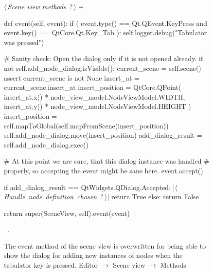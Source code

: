 \documentclass[%
    a4paper,    %
    justified,  %
    nobib,      %
    openany     %
]{tufte-book}
\begin{document}
\begin{figure}
\begin{flushleft} \small
\begin{minipage}{\linewidth}\label{scrap151}\raggedright\small
{} $\langle\,${\itshape Scene view methods}\nobreak\ {\footnotesize {?}}$\,\rangle\equiv$
\vspace{-1ex}
\begin{pythoncode}
def event(self, event):
    if (
            event.type() == Qt.QEvent.KeyPress and
            event.key()  == QtCore.Qt.Key_Tab
    ):
        self.logger.debug("Tabulator was pressed")

        # Sanity check: Open the dialog only if it is not opened already.
        if not self.add_node_dialog.isVisible():
            current_scene = self.scene()
            assert current_scene is not None
            insert_at = current_scene.insert_at
            insert_position = QtCore.QPoint(
                insert_at.x() * node_view_model.NodeViewModel.WIDTH,
                insert_at.y() * node_view_model.NodeViewModel.HEIGHT
            )
            insert_position = self.mapToGlobal(self.mapFromScene(insert_position))
            self.add_node_dialog.move(insert_position)
            add_dialog_result = self.add_node_dialog.exec()

            # At this point we are sure, that this dialog instance was handled
            # properly, so accepting the event might be sane here.
            event.accept()

            if add_dialog_result == QtWidgets.QDialog.Accepted:
                |\hbox{$\langle\,${\itshape Handle node definition chosen}\nobreak\ {\footnotesize ?}$\,\rangle$}|
                return True
            else:
                return False

    return super(SceneView, self).event(event)
|\NWsep|
\end{pythoncode}
\vspace{1.5ex}
\footnotesize
\begin{list}{}{\setlength{\itemsep}{-\parsep}\setlength{\itemindent}{-\leftmargin}}
\item \NWtxtMacroRefIn\ .

\item{}
\end{list}
\end{minipage}\vspace{4ex}
\end{flushleft}
\caption{The event method of the scene view is overwritten for being able to
  show the dialog for adding new instances of nodes when the tabulator key is
  pressed.
  \newline{}\newline{}Editor $\rightarrow$ Scene view $\rightarrow$ Methods}
\label{editor:lst:scene-view:methods:event}
\end{figure}
\end{document}
